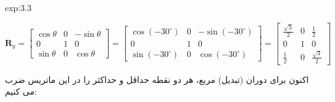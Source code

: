 {\begin{spacing}{1.5}
\begin{example}{exp:3.3}
            \begin{center}
                $\textbf{R}_{y}=\begin{bmatrix}
                                    \cos\theta & 0 & -\sin\theta \\
                                    0          & 1 & 0           \\
                                    \sin\theta & 0 & \cos\theta
                \end{bmatrix}=\begin{bmatrix}
                                  \cos(-30^\circ) & 0 & -\sin(-30^\circ) \\
                                  0               & 1 & 0                \\
                                  \sin(-30^\circ) & 0 & \cos(-30^\circ)
                \end{bmatrix}=\begin{bmatrix}
                                  \frac{\displaystyle \sqrt{\displaystyle 3}}{\displaystyle 2} & 0 & \frac{\displaystyle 1}{\displaystyle 2}                      \\
                                  0                                                            & 1 & 0                                                            \\
                                  \frac{\displaystyle 1}{\displaystyle 2}                      & 0 & \frac{\displaystyle \sqrt{\displaystyle 3}}{\displaystyle 2}
                \end{bmatrix}$
            \end{center}

            اکنون برای دوران (تبدیل) مربع، هر دو نقطه حداقل و حداکثر را در این ماتریس ضرب می کنیم:


\end{example}
\end{spacing}}

